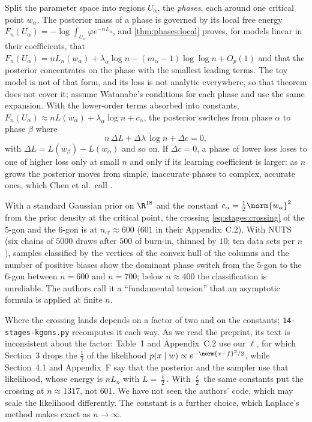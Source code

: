 \begin{refsection}
Split the parameter space into regions $U_\alpha$, the \emph{phases}, each around one critical point $w_\alpha$. The posterior mass of a phase is governed by its local free energy $F_n(U_\alpha)=-\log\int_{U_\alpha}\varphi e^{-nL_n}$, and \cref{thm:phases:local} proves, for models linear in their coefficients, that $F_n(U_\alpha)=nL_n(w_\alpha)+\lambda_\alpha\log n-(m_\alpha-1)\log\log n+O_p(1)$ and that the posterior concentrates on the phase with the smallest leading terms. The toy model is not of that form, and its loss is not analytic everywhere, so that theorem does not cover it; \textcite{ChenEtAl2023} assume Watanabe's conditions for each phase and use the same expansion. With the lower-order terms absorbed into constants, $F_n(U_\alpha)\approx nL(w_\alpha)+\lambda_\alpha\log n+c_\alpha$, the posterior switches from phase $\alpha$ to phase $\beta$ where
\begin{equation}\label{eq:stages:crossing}
n\,\Delta L+\Delta\lambda\,\log n+\Delta c=0,
\end{equation}
with $\Delta L=L(w_\beta)-L(w_\alpha)$ and so on. If $\Delta c=0$, a phase of lower loss loses to one of higher loss only at small $n$ and only if its learning coefficient is larger: as $n$ grows the posterior moves from simple, inaccurate phases to complex, accurate ones, which Chen et al.\ call .

\begin{observation}
With a standard Gaussian prior on $\R^{18}$ and the constant $c_\alpha=\frac12\norm{w_\alpha}^2$ from the prior density at the critical point, the crossing \eqref{eq:stages:crossing} of the $5$-gon and the $6$-gon is at $n_{\mathrm{cr}}\approx600$ ($601$ in their Appendix~C.2). With NUTS (six chains of $5000$ draws after $500$ of burn-in, thinned by $10$; ten data sets per $n$), samples classified by the vertices of the convex hull of the columns and the number of positive biases show the dominant phase switch from the $5$-gon to the $6$-gon between $n=600$ and $n=700$; below $n\approx400$ the classification is unreliable. The authors call it a ``fundamental tension'' that an asymptotic formula is applied at finite $n$.
\end{observation}

Where the crossing lands depends on a factor of two and on the constants; \texttt{14-stages-kgons.py} recomputes it each way. As we read the preprint, its text is inconsistent about the factor: Table~1 and Appendix~C.2 use our $\ell$, for which Section~3 drops the $\frac12$ of the likelihood $p(x\mid w)\propto e^{-\norm{x-f}^2/2}$, while Section~4.1 and Appendix~F say that the posterior and the sampler use that likelihood, whose energy is $nL_n$ with $L=\frac\ell2$. With $\frac\ell2$ the same constants put the crossing at $n\approx1317$, not $601$. We have not seen the authors' code, which may scale the likelihood differently. The constant is a further choice, which Laplace's method makes exact as $n\to\infty$.


\end{refsection}

